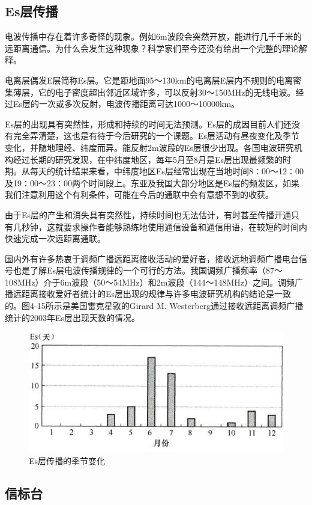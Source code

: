 \documentclass[12pt,UTF8]{ctexbook}
\begin{document}
\subsection{Es层传播}

电波传播中存在着许多奇怪的现象。例如6m波段会突然开放，能进行几千千米的远距离通信。为什么会发生这种现象？科学家们至今还没有给出一个完整的理论解释。

电离层偶发E层简称Es层。它是距地面95～130km的电离层E层内不规则的电离密集薄层，它的电子密度超出邻近区域许多，可以反射30～150MHz的无线电波。经过Es层的一次或多次反射，电波传播距离可达1000～10000km。

Es层的出现具有突然性，形成和持续的时间无法预测。Es层的成因目前人们还没有完全弄清楚，这也是有待于今后研究的一个课题。Es层活动有昼夜变化及季节变化，并随地理经、纬度而异。能反射2m波段的Es层很少出现。各国电波研究机构经过长期的研究发现，在中纬度地区，每年5月至8月是Es层出现最频繁的时期。从每天的统计结果来看，中纬度地区Es层经常出现在当地时间8∶00～12∶00及19∶00～23∶00两个时间段上。东亚及我国大部分地区是Es层的频发区，如果我们注意利用这个有利条件，可能在今后的通联中会有意想不到的收获。

由于Es层的产生和消失具有突然性，持续时间也无法估计，有时甚至传播开通只有几秒钟，这就要求操作者能够熟练地使用通信设备和通信用语，在较短的时间内快速完成一次远距离通联。

国内外有许多热衷于调频广播远距离接收活动的爱好者，接收远地调频广播电台信号也是了解Es层电波传播规律的一个可行的方法。我国调频广播频率（87～108MHz）介于6m波段（50～54MHz）和2m波段（144～148MHz）之间。调频广播远距离接收爱好者统计的Es层出现的规律与许多电波研究机构的结论是一致的。图4-15所示是美国雷克星敦的Girard M. Westerberg通过接收远距离调频广播统计的2003年Es层出现天数的情况。

\begin{figure}[htbp]
	\centering
	\includegraphics[width=0.7\linewidth]{58}
	\caption{Es层传播的季节变化}
	\label{fig:1}
\end{figure}

\subsection{信标台}
\end{document}
